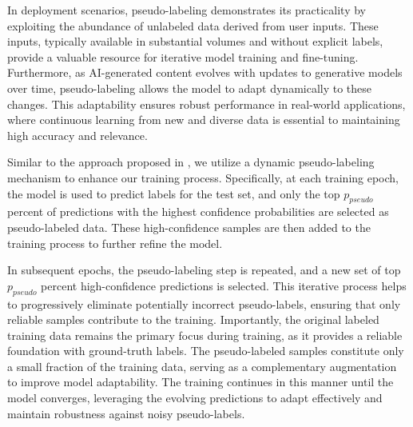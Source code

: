 In deployment scenarios, pseudo-labeling demonstrates its practicality by exploiting the abundance of unlabeled data derived from user inputs. These inputs, typically available in substantial volumes and without explicit labels, provide a valuable resource for iterative model training and fine-tuning. Furthermore, as AI-generated content evolves with updates to generative models over time, pseudo-labeling allows the model to adapt dynamically to these changes. This adaptability ensures robust performance in real-world applications, where continuous learning from new and diverse data is essential to maintaining high accuracy and relevance.

Similar to the approach proposed in \cite{toofanee2023dfu}, we utilize a dynamic pseudo-labeling mechanism to enhance our training process. Specifically, at each training epoch, the model is used to predict labels for the test set, and only the top $p_{pseudo}$ percent of predictions with the highest confidence probabilities are selected as pseudo-labeled data. These high-confidence samples are then added to the training process to further refine the model.

In subsequent epochs, the pseudo-labeling step is repeated, and a new set of top $p_{pseudo}$ percent high-confidence predictions is selected. This iterative process helps to progressively eliminate potentially incorrect pseudo-labels, ensuring that only reliable samples contribute to the training. Importantly, the original labeled training data remains the primary focus during training, as it provides a reliable foundation with ground-truth labels. The pseudo-labeled samples constitute only a small fraction of the training data, serving as a complementary augmentation to improve model adaptability. The training continues in this manner until the model converges, leveraging the evolving predictions to adapt effectively and maintain robustness against noisy pseudo-labels.
